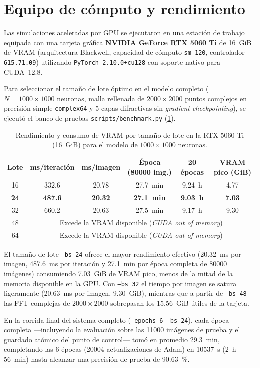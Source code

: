\section{Equipo de cómputo y rendimiento}\label{sec:hardware}

Las simulaciones aceleradas por GPU se ejecutaron en una estación de trabajo equipada con una
tarjeta gráfica \textbf{NVIDIA GeForce RTX 5060 Ti} de \SI{16}{GiB} de VRAM (arquitectura
Blackwell, capacidad de cómputo \texttt{sm\_120}, controlador \texttt{615.71.09}) utilizando
\texttt{PyTorch 2.10.0+cu128} con soporte nativo para CUDA~12.8.

Para seleccionar el tamaño de lote óptimo en el modelo completo ($N = 1000\times 1000$
neuronas, malla rellenada de $2000\times 2000$ puntos complejos en precisión simple
\texttt{complex64} y 5 capas difractivas sin \emph{gradient checkpointing}), se ejecutó el
banco de pruebas \texttt{scripts/benchmark.py} (\cref{tab:benchmark}).

\begin{table}[htb]
\centering
\caption{Rendimiento y consumo de VRAM por tamaño de lote en la RTX 5060 Ti (\SI{16}{GiB}) para el modelo de $1000\times 1000$ neuronas.}
\label{tab:benchmark}
\begin{tabular}{@{}cccccc@{}}
\toprule
Lote & ms/iteración & ms/imagen & Época (\num{80000} img.) & 20 épocas & VRAM pico (\si{GiB})\\
\midrule
16 & 332.6 & 20.78 & \SI{27.7}{min} & \SI{9.24}{h} & 4.77\\
\textbf{24} & \textbf{487.6} & \textbf{20.32} & \textbf{\SI{27.1}{min}} & \textbf{\SI{9.03}{h}} & \textbf{7.03}\\
32 & 660.2 & 20.63 & \SI{27.5}{min} & \SI{9.17}{h} & 9.30\\
48 & \multicolumn{5}{c}{Excede la VRAM disponible (\emph{CUDA out of memory})}\\
64 & \multicolumn{5}{c}{Excede la VRAM disponible (\emph{CUDA out of memory})}\\
\bottomrule
\end{tabular}
\end{table}

El tamaño de lote \texttt{--bs 24} ofrece el mayor rendimiento efectivo
(\SI{20.32}{ms} por imagen, \SI{487.6}{ms} por iteración y \SI{27.1}{min} por época completa de
\num{80000} imágenes) consumiendo \SI{7.03}{GiB} de VRAM pico, menos de la mitad de la memoria
disponible en la GPU. Con \texttt{--bs 32} el tiempo por imagen se satura ligeramente
(\SI{20.63}{ms} por imagen, \SI{9.30}{GiB}), mientras que a partir de \texttt{--bs 48} las FFT
complejas de $2000\times 2000$ sobrepasan los \SI{15.56}{GiB} útiles de la tarjeta.

En la corrida final del sistema completo (\texttt{--epochs 6 --bs 24}), cada época completa
—incluyendo la evaluación sobre las \num{11000} imágenes de prueba y el guardado atómico del
punto de control— tomó en promedio \SI{29.3}{min}, completando las 6 épocas (\num{20004}
actualizaciones de Adam) en \SI{10537}{s} (\SI{2}{h} \SI{56}{min}) hasta alcanzar una
precisión de prueba de \SI{90.63}{\percent}.
